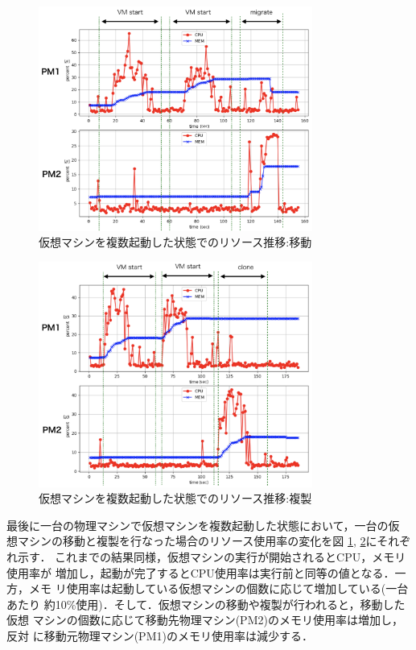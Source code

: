 \documentclass[submit,techrep]{ipsj}
\begin{document}
\begin{figure}[tb]
	\includegraphics[width=9.0cm,bb=0 0 804 656]{fig/migrate_vm2.png}
	\caption{仮想マシンを複数起動した状態でのリソース推移:移動}
	\label{fig:graph_migrate_vm2}
\end{figure}
\begin{figure}[tb]
	\includegraphics[width=9.0cm,bb=0 0 802 660]{fig/clone_vm2.png}
	\caption{仮想マシンを複数起動した状態でのリソース推移:複製}
	\label{fig:graph_clone_vm2}
\end{figure}
最後に一台の物理マシンで仮想マシンを複数起動した状態において，一台の仮
想マシンの移動と複製を行なった場合のリソース使用率の変化を図
\ref{fig:graph_migrate_vm2}, \ref{fig:graph_clone_vm2}にそれぞれ示す．
これまでの結果同様，仮想マシンの実行が開始されるとCPU，メモリ使用率が
増加し，起動が完了するとCPU使用率は実行前と同等の値となる．一方，メモ
リ使用率は起動している仮想マシンの個数に応じて増加している(一台あたり
約10\%使用)．そして．仮想マシンの移動や複製が行われると，移動した仮想
マシンの個数に応じて移動先物理マシン(PM2)のメモリ使用率は増加し，反対
に移動元物理マシン(PM1)のメモリ使用率は減少する．
\end{document}
